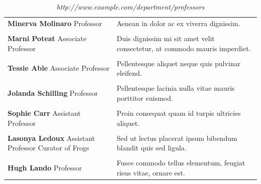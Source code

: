 \documentclass{book} %
\begin{document}
\begin{table}[ht!]
\begin{tabular}{p{2.5in} p{4.5in}}
\textbf{Minerva Molinaro} \newline Professor & Aenean in dolor ac ex viverra dignissim.\\ \\
\textbf{Marni Poteat} \newline Associate Professor & Duis dignissim mi sit amet velit consectetur, at commodo mauris imperdiet.\\ \\
\textbf{Tessie Able} \newline Associate Professor &  Pellentesque aliquet neque quis pulvinar eleifend.\\ \\
\textbf{Jolanda Schilling} \newline Professor & Pellentesque lacinia nulla vitae mauris porttitor euismod.\\ \\
\textbf{Sophie Carr} \newline Assistant Professor & Proin consequat quam id turpis ultricies aliquet.\\ \\
\textbf{Lasonya Ledoux} \newline Assistant Professor \newline Curator of Frogs & Sed ut lectus placerat ipsum bibendum blandit quis sed ligula.\\ \\
\textbf{Hugh Lando} \newline Professor & Fusce commodo tellus elementum, feugiat risus vitae, ornare est.

\end{tabular}
\caption*{\textit{http://www.example.com/department/professors}}
\end{table}

\clearpage
\clearpage
\end{document}
